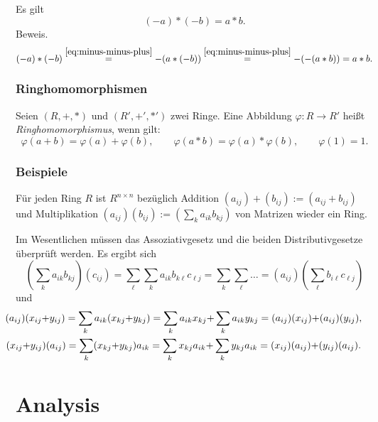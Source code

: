 \documentclass[a4paper,11pt,fleqn,twoside]{scrartcl}
\numberwithin{equation}{section}
\newcommand{\strong}[1]{{\sf\bfseries #1}}
\newenvironment{Definition}{\par\noindent\strong{Definition.}}{\par}
\newcommand{\emdef}[1]{\emph{#1}}
\begin{document}
Es gilt
\begin{equation}
(-a)*(-b) = a*b.
\end{equation}
Beweis.
\begin{equation}
(-a)*(-b) \stackrel{\eqref{eq:minus-minus-plus}}= -(a*(-b))
\stackrel{\eqref{eq:minus-minus-plus}}= -(-(a*b)) = a*b.
\end{equation}
\subsubsection{Ringhomomorphismen}
\begin{Definition}
Seien $(R,+,*)$ und $(R',+',*')$ zwei Ringe. Eine Abbildung
$\varphi\colon R\to R'$ heißt \emdef{Ringhomomorphismus},
wenn gilt:
\begin{equation}
\varphi(a+b) = \varphi(a)+\varphi(b),\qquad
\varphi(a*b) = \varphi(a)*\varphi(b),\qquad
\varphi(1) = 1.
\end{equation}
\end{Definition}
\subsubsection{Beispiele}
Für jeden Ring $R$ ist $R^{n\times n}$ bezüglich
Addition $(a_{ij})+(b_{ij}):=(a_{ij}+b_{ij})$
und Multiplikation $(a_{ij})(b_{ij}):=(\sum_k a_{ik}b_{kj})$
von Matrizen wieder ein Ring.

Im Wesentlichen müssen das Assoziativgesetz und die beiden
Distributivgesetze überprüft werden. Es ergibt sich
\begin{equation}
(\sum_k a_{ik}b_{kj})(c_{ij})
= \sum_\ell \sum_k a_{ik}b_{k\ell}c_{\ell j}
= \sum_k \sum_{\ell} \ldots
= (a_{ij})(\sum_\ell b_{i\ell}c_{\ell j})
\end{equation}
und
\begin{gather}
\hspace{-2.2em}(a_{ij})(x_{ij}{+}y_{ij})
= \sum_k a_{ik} (x_{kj}{+}y_{kj})
= \sum_k a_{ik} x_{kj}{+}\sum_k a_{ik}y_{kj}
= (a_{ij})(x_{ij}){+}(a_{ij})(y_{ij}),\\
\hspace{-2.2em}(x_{ij}{+}y_{ij})(a_{ij})
= \sum_k (x_{kj}{+}y_{kj})a_{ik} 
= \sum_k x_{kj}a_{ik}{+}\sum_k y_{kj}a_{ik}
= (x_{ij})(a_{ij}){+}(y_{ij})(a_{ij}).
\end{gather}

\section{Analysis}
\end{document}
